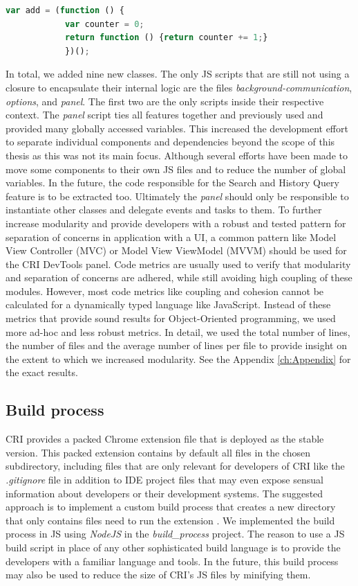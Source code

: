 		\begin{lstlisting}[language=JavaScript, caption={Example of RxJS code.},label={lst:closure}]
			var add = (function () {
			var counter = 0;
			return function () {return counter += 1;}
			})();
		\end{lstlisting}
In total, we added nine new classes. The only JS scripts that are still not using a closure to encapsulate their internal logic are the files \emph{background-communication}, \emph{options}, and \emph{panel}. The first two are the only scripts inside their respective context. The \emph{panel} script ties all features together and previously used and provided many globally accessed variables. This increased the development effort to separate individual components and dependencies beyond the scope of this thesis as this was not its main focus. Although several efforts have been made to move some components to their own JS files and to reduce the number of global variables. In the future, the code responsible for the Search and History Query feature is to be extracted too. Ultimately the \emph{panel} should only be responsible to instantiate other classes and delegate events and tasks to them. To further increase modularity and provide developers with a robust and tested pattern for separation of concerns in application with a UI, a common pattern like Model View Controller (MVC) or Model View ViewModel (MVVM) should be used for the CRI DevTools panel.
Code metrics are usually used to verify that modularity and separation of concerns are adhered, while still avoiding high coupling of these modules. However, most code metrics like coupling and cohesion \cite{Coupling} cannot be calculated for a dynamically typed language like JavaScript. Instead of these metrics that provide sound results for Object-Oriented programming, we used more ad-hoc and less robust metrics. In detail, we used the total number of lines, the number of files and the average number of lines per file to provide insight on the extent to which we increased modularity. See the Appendix \ref{ch:Appendix} for the exact results.
	
\subsection{Build process}
CRI provides a packed Chrome extension file that is deployed as the stable version. This packed extension contains by default all files in the chosen subdirectory, including files that are only relevant for developers of CRI like the \emph{.gitignore} file in addition to IDE project files that may even expose sensual information about developers or their development systems. The suggested approach is to implement a custom build process that creates a new directory that only contains files need to run the extension \cite{BuildScript}. We implemented the build process in JS using \emph{NodeJS} \cite{NodeJS} in the \emph{build\_process} project. The reason to use a JS build script in place of any other sophisticated build language is to provide the developers with a familiar language and tools. In the future, this build process may also be used to reduce the size of CRI's JS files by minifying them. 